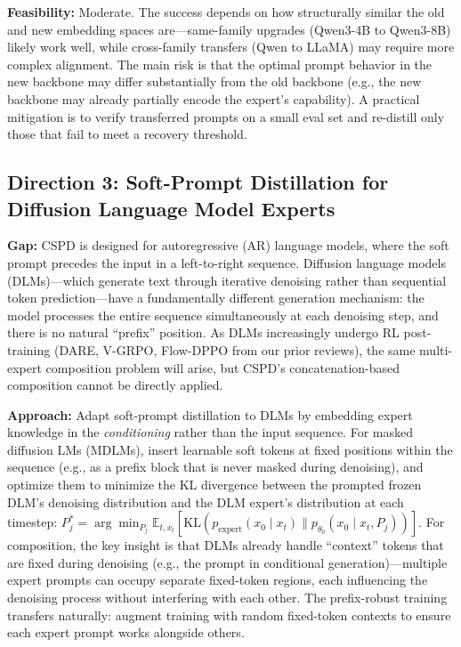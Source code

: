 \documentclass[11pt,a4paper]{article}
\begin{document}
\textbf{Feasibility:} Moderate. The success depends on how structurally similar the old and new embedding spaces are---same-family upgrades (Qwen3-4B to Qwen3-8B) likely work well, while cross-family transfers (Qwen to LLaMA) may require more complex alignment. The main risk is that the optimal prompt behavior in the new backbone may differ substantially from the old backbone (e.g., the new backbone may already partially encode the expert's capability). A practical mitigation is to verify transferred prompts on a small eval set and re-distill only those that fail to meet a recovery threshold.

\subsection{Direction 3: Soft-Prompt Distillation for Diffusion Language Model Experts}
\textbf{Gap:} CSPD is designed for autoregressive (AR) language models, where the soft prompt precedes the input in a left-to-right sequence. Diffusion language models (DLMs)---which generate text through iterative denoising rather than sequential token prediction---have a fundamentally different generation mechanism: the model processes the entire sequence simultaneously at each denoising step, and there is no natural ``prefix'' position. As DLMs increasingly undergo RL post-training (DARE, V-GRPO, Flow-DPPO from our prior reviews), the same multi-expert composition problem will arise, but CSPD's concatenation-based composition cannot be directly applied.

\textbf{Approach:} Adapt soft-prompt distillation to DLMs by embedding expert knowledge in the \emph{conditioning} rather than the input sequence. For masked diffusion LMs (MDLMs), insert learnable soft tokens at fixed positions within the sequence (e.g., as a prefix block that is never masked during denoising), and optimize them to minimize the KL divergence between the prompted frozen DLM's denoising distribution and the DLM expert's distribution at each timestep: $P_j^* = \arg\min_{P_j} \mathbb{E}_{t, x_t}[\text{KL}(p_{\text{expert}}(x_0 \mid x_t) \| p_{\theta_0}(x_0 \mid x_t, P_j))]$. For composition, the key insight is that DLMs already handle ``context'' tokens that are fixed during denoising (e.g., the prompt in conditional generation)---multiple expert prompts can occupy separate fixed-token regions, each influencing the denoising process without interfering with each other. The prefix-robust training transfers naturally: augment training with random fixed-token contexts to ensure each expert prompt works alongside others.
\end{document}
